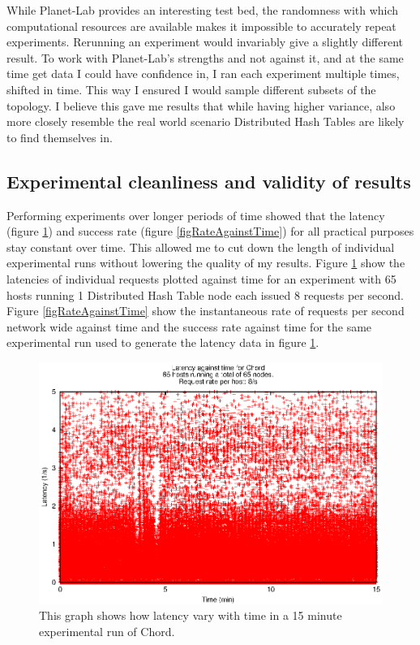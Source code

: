 While Planet-Lab provides an interesting test bed, the randomness with which computational resources are available makes it impossible to accurately repeat experiments. Rerunning an experiment would invariably give a slightly different result.
To work with Planet-Lab's strengths and not against it, and at the same time get data I could have confidence in, I ran each experiment multiple times, shifted in time. This way I ensured I would sample different subsets of the topology. I believe this gave me results that while having higher variance, also more closely resemble the real world scenario Distributed Hash Tables are likely to find themselves in.

\subsection{Experimental cleanliness and validity of results}
Performing experiments over longer periods of time showed that the latency (figure \ref{figLatencyAgainstTime}) and success rate (figure \ref{figRateAgainstTime}) for all practical purposes stay constant over time.
This allowed me to cut down the length of individual experimental runs without lowering the quality of my results.
Figure \ref{figLatencyAgainstTime} show the latencies of individual requests plotted against time for an experiment with 65 hosts running 1 Distributed Hash Table node each issued 8 requests per second.
Figure \ref{figRateAgainstTime} show the instantaneous rate of requests per second network wide against time and the success rate against time for the same experimental run used to generate the latency data in figure \ref{figLatencyAgainstTime}. 

\begin{figure}[!htbp]
  \begin{center}
    \includegraphics[width=0.9\linewidth]{illustrations/latency_aginst_time_chord.eps}
    \caption{This graph shows how latency vary with time in a 15 minute experimental run of Chord.}
    \label{figLatencyAgainstTime}
  \end{center}
\end{figure}

